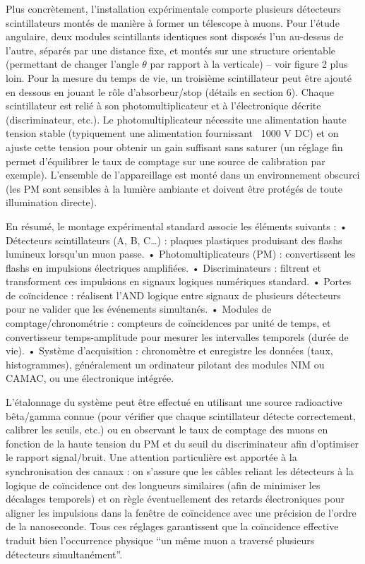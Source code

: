 \documentclass[a4paper,12pt,twoside]{article}
\begin{document}
Plus concrètement, l’installation expérimentale comporte plusieurs détecteurs scintillateurs montés de manière à former un télescope à muons. Pour l’étude angulaire, deux modules scintillants identiques sont disposés l’un au-dessus de l’autre, séparés par une distance fixe, et montés sur une structure orientable (permettant de changer l’angle $\theta$ par rapport à la verticale) – voir figure 2 plus loin. Pour la mesure du temps de vie, un troisième scintillateur peut être ajouté en dessous en jouant le rôle d’absorbeur/stop (détails en section 6). Chaque scintillateur est relié à son photomultiplicateur et à l’électronique décrite (discriminateur, etc.). Le photomultiplicateur nécessite une alimentation haute tension stable (typiquement une alimentation fournissant ~1000 V DC) et on ajuste cette tension pour obtenir un gain suffisant sans saturer (un réglage fin permet d’équilibrer le taux de comptage sur une source de calibration par exemple). L’ensemble de l’appareillage est monté dans un environnement obscurci (les PM sont sensibles à la lumière ambiante et doivent être protégés de toute illumination directe).

En résumé, le montage expérimental standard associe les éléments suivants :
	•	Détecteurs scintillateurs (A, B, C…) : plaques plastiques produisant des flashs lumineux lorsqu’un muon passe.
	•	Photomultiplicateurs (PM) : convertissent les flashs en impulsions électriques amplifiées.
	•	Discriminateurs : filtrent et transforment ces impulsions en signaux logiques numériques standard.
	•	Portes de coïncidence : réalisent l’AND logique entre signaux de plusieurs détecteurs pour ne valider que les événements simultanés.
	•	Modules de comptage/chronométrie : compteurs de coïncidences par unité de temps, et convertisseur temps-amplitude pour mesurer les intervalles temporels (durée de vie).
	•	Système d’acquisition : chronomètre et enregistre les données (taux, histogrammes), généralement un ordinateur pilotant des modules NIM ou CAMAC, ou une électronique intégrée.

L’étalonnage du système peut être effectué en utilisant une source radioactive bêta/gamma connue (pour vérifier que chaque scintillateur détecte correctement, calibrer les seuils, etc.) ou en observant le taux de comptage des muons en fonction de la haute tension du PM et du seuil du discriminateur afin d’optimiser le rapport signal/bruit. Une attention particulière est apportée à la synchronisation des canaux : on s’assure que les câbles reliant les détecteurs à la logique de coïncidence ont des longueurs similaires (afin de minimiser les décalages temporels) et on règle éventuellement des retards électroniques pour aligner les impulsions dans la fenêtre de coïncidence avec une précision de l’ordre de la nanoseconde. Tous ces réglages garantissent que la coïncidence effective traduit bien l’occurrence physique “un même muon a traversé plusieurs détecteurs simultanément”.
\end{document}
